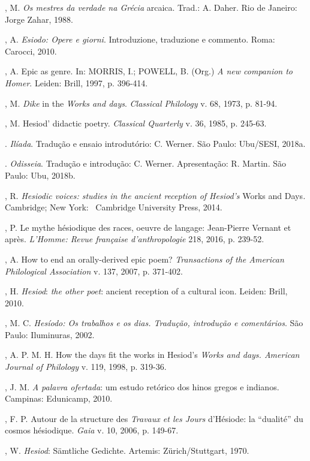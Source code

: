 \begin{bibliohedra}
, M. \emph{Os mestres da verdade na Grécia} arcaica. Trad.: A.
Daher. Rio de Janeiro: Jorge Zahar, 1988.

, A. \emph{Esiodo: Opere e giorni}. Introduzione, traduzione e
commento. Roma: Carocci, 2010.

, A. Epic as genre. In: MORRIS, I.; POWELL, B. (Org.) \emph{A new
companion to Homer}. Leiden: Brill, 1997, p. 396-414.

, M. \emph{Dike} in the \emph{Works and days}. \emph{Classical
Philology} v. 68, 1973, p. 81-94.

, M. Hesiod' didactic poetry. \emph{Classical Quarterly} v. 36,
1985, p. 245-63.

. \emph{Ilíada}. Tradução e ensaio introdutório: C. Werner. São
Paulo: Ubu/SESI, 2018a.

\titidem. \emph{Odisseia}. Tradução e introdução: C. Werner. Apresentação: R.
Martin. São Paulo: Ubu, 2018b.

, R. \emph{Hesiodic voices: studies in the ancient reception of
Hesiod's} Works and Days\emph{.} Cambridge; New York: ~Cambridge
University Press, 2014.

, P. Le mythe hésiodique des races, oeuvre de langage:
Jean-Pierre Vernant et après. \emph{L'Homme: Revue française
d'anthropologie} 218, 2016, p. 239-52.

, A. How to end an orally-derived epic poem? \emph{Transactions of
the American Philological Association} v. 137, 2007, p. 371-402.

, H. \emph{Hesiod}: \emph{the other poet}: ancient reception of a
cultural icon. Leiden: Brill, 2010.

, M. C. \emph{Hesíodo: Os trabalhos e os dias. Tradução, introdução
e comentários}. São Paulo: Iluminuras, 2002.

, A. P. M. H. How the days fit the works in Hesiod's
\emph{Works and days. American Journal of Philology} v. 119, 1998, p.
319-36.

, J. M. \emph{A palavra ofertada}: um estudo retórico dos hinos
gregos e indianos. Campinas: Edunicamp, 2010.

, F. P. Autour de la structure des \emph{Travaux et les Jours}
d'Hésiode: la ``dualité'' du cosmos hésiodique. \emph{Gaia} v. 10, 2006,
p. 149-67.

, W. \emph{Hesiod}: Sämtliche Gedichte. Artemis: Zürich/Stuttgart,
1970.


\end{bibliohedra}
